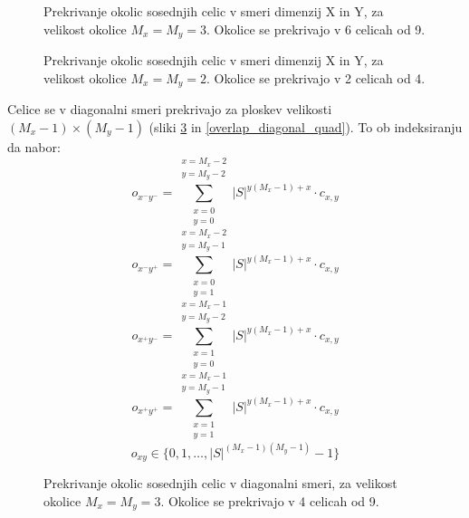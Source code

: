 \documentclass[12pt,a4paper,openany,twoside]{book}
\begin{document}
\begin{figure}[htb]
\centerline{}
\caption[Prekrivaje okolic \(3 \times 3\) v smeri dimenzij X in Y.]
{Prekrivanje okolic sosednjih celic v smeri dimenzij X in Y, za velikost okolice \(M_x=M_y=3\).
Okolice se prekrivajo v 6 celicah od 9.}
\label{overlap_dimension_moore}
\end{figure}

\begin{figure}[htb]
\centerline{}
\caption[Prekrivaje okolic \(2 \times 2\) v smeri dimenzij X in Y.]
{Prekrivanje okolic sosednjih celic v smeri dimenzij X in Y, za velikost okolice \(M_x=M_y=2\).
Okolice se prekrivajo v 2 celicah od 4.}
\label{overlap_dimension_quad}
\end{figure}

Celice se v diagonalni smeri prekrivajo za ploskev velikosti \((M_x-1) \times (M_y-1)\) (sliki \ref{overlap_diagonal_moore} in \ref{overlap_diagonal_quad}).
To ob indeksiranju da nabor:
\begin{equation}
o_{{x^-}{y^-}} = \sum_{\substack{x=0 \\ y=0}}^{\substack{x=M_x-2 \\ y=M_y-2}} |S|^{y (M_x-1) + x} \cdot c_{x,y}
\end{equation}
\begin{equation}
o_{{x^-}{y^+}} = \sum_{\substack{x=0 \\ y=1}}^{\substack{x=M_x-2 \\ y=M_y-1}} |S|^{y (M_x-1) + x} \cdot c_{x,y}
\end{equation}
\begin{equation}
o_{{x^+}{y^-}} = \sum_{\substack{x=1 \\ y=0}}^{\substack{x=M_x-1 \\ y=M_y-2}} |S|^{y (M_x-1) + x} \cdot c_{x,y}
\end{equation}
\begin{equation}
o_{{x^+}{y^+}} = \sum_{\substack{x=1 \\ y=1}}^{\substack{x=M_x-1 \\ y=M_y-1}} |S|^{y (M_x-1) + x} \cdot c_{x,y}
\end{equation}
\begin{equation}
o_{xy} \in \{0, 1, \dots, |S|^{(M_x-1)(M_y-1)}-1\}
\end{equation}

\begin{figure}[htb]
\centerline{}
\caption[Prekrivanje okolic \(3 \times 3\) - diagonalno.]
{Prekrivanje okolic sosednjih celic v diagonalni smeri, za velikost okolice \(M_x=M_y=3\).
Okolice se prekrivajo v 4 celicah od 9.}
\label{overlap_diagonal_moore}
\end{figure}
\end{document}
